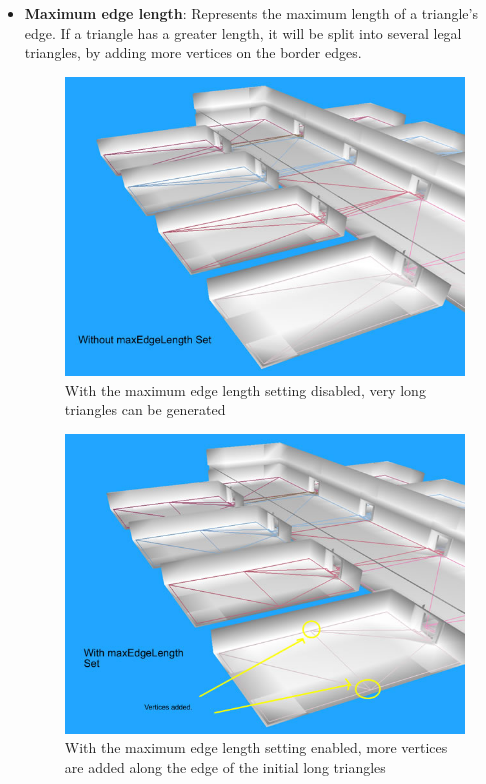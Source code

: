 \begin{itemize}
  \item\textbf{Maximum edge length}: Represents the maximum length of a triangle's edge. If a triangle has a greater length, it will be split into several legal triangles, by adding more vertices on the border edges.
  
  \begin{figure}[H]
	\centering
	\includegraphics[width=1\textwidth]{../images/max_edge_0.png}
	\caption{With the maximum edge length setting disabled, very long triangles can be generated}
\end{figure}

  \begin{figure}[H]
	\centering
	\includegraphics[width=1\textwidth]{../images/max_edge_1.png}
	\caption{With the maximum edge length setting enabled, more vertices are added along the edge of the initial long triangles}
\end{figure}
  

\end{itemize}
